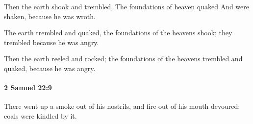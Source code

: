 			\begin{versebox}
					\item[BHS] 
					\item[ASV] Then the earth shook and trembled, The foundations of heaven quaked And were shaken, because he was wroth.
					\item[NIV] The earth trembled and quaked, the foundations of the heavens shook; they trembled because he was angry.
					\item[NRSV] Then the earth reeled and rocked; the foundations of the heavens trembled and quaked, because he was angry.
			\end{versebox}

		\paragraph{2 Samuel 22:9} %
			\label{2SAMUEL-22-9}

			There went up a smoke out of his nostrils, and fire out of his mouth devoured: coals were kindled by it.

